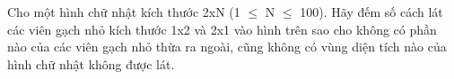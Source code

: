 Cho một hình chữ nhật kích thước 2xN (1 $\le$ N $\le$ 100). Hãy đếm số cách lát các viên gạch nhỏ kích thước 1x2 và 2x1 vào hình trên sao cho không có phần nào của các viên gạch nhỏ thừa ra ngoài, cũng không có vùng diện tích nào của hình chữ nhật không được lát.  

\